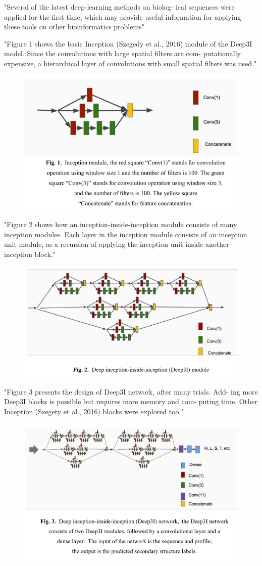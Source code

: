 \documentclass[]{scrartcl}
\begin{document}
"Several of the latest deep-learning methods on biolog- ical sequences were applied for the first time, which may provide useful information for applying these tools on other bioinformatics problems" \cite{Fang2017}

"Figure 1 shows the basic Inception (Szegedy et al., 2016) module of the Deep3I model. Since the convolutions with large spatial filters are com- putationally expensive, a hierarchical layer of convolutions with small spatial filters was used." \cite{Fang2017}
\begin{figure}[h]
	\centering
	\includegraphics[width=0.7\linewidth]{inception}
\end{figure}
"Figure 2 shows how an inception-inside-inception module consists of
many inception modules. Each layer in the inception module consists of an inception unit module, as a recursion of applying the inception unit inside another inception block." \cite{Fang2017}
\begin{figure}[h]
	\centering
	\includegraphics[width=0.7\linewidth]{IiI}
\end{figure}
"Figure 3 presents the design of Deep3I network, after many trials. Add-
ing more Deep3I blocks is possible but requires more memory and com- puting time. Other Inception (Szegety et al., 2016) blocks were explored too." \cite{Fang2017}
\begin{figure}[h]
	\centering
	\includegraphics[width=0.7\linewidth]{Mufold}
	\label{fig:Mufold}
\end{figure}
\end{document}
